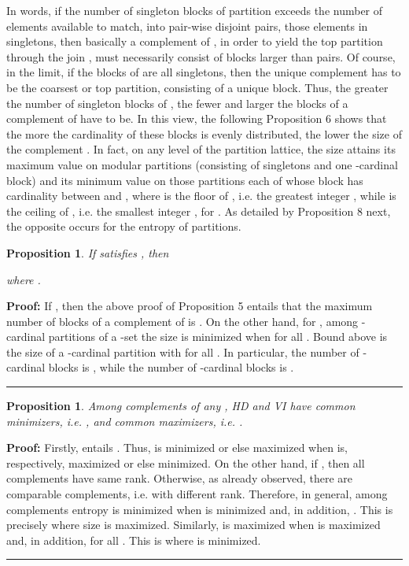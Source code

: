 \documentclass[a4paper,10pt]{article}
\newtheorem{proposition}[theorem]{Proposition}
\newenvironment{proof}[1][Proof]{\noindent\textbf{#1: }}{\ \rule{0.5em}{0.5em}}
\begin{document}
In words, if the number  of singleton blocks of partition  exceeds the number  of elements  available to match, into pair-wise
disjoint pairs, those elements  in singletons, then basically a complement  of , in order to yield the top partition  through the join , must
necessarily consist of blocks larger than pairs. Of course, in the limit, if the blocks of  are all singletons, then the unique complement  has to be the
coarsest or top partition, consisting of a unique block. Thus, the greater the number  of singleton blocks of , the fewer and larger the blocks  of a complement
 of  have to be. In this view, the following Proposition 6 shows that the more the cardinality  of these blocks  is evenly distributed, the lower the size
 of the complement . In fact, on any level  of the partition lattice, the size attains its maximum value on
modular partitions (consisting of  singletons and one -cardinal block) and its minimum value on those partitions each of whose block has cardinality between
 and , where  is the floor of , i.e. the greatest integer , while
 is the ceiling of , i.e. the smallest integer , for . As detailed by Proposition 8 next, the opposite occurs for the
entropy of partitions.

\begin{proposition}
If  satisfies , then

where .
\end{proposition}

\begin{proof}
If , then the above proof of Proposition 5 entails that the maximum number  of blocks of a complement of
 is . On the other hand, for , among -cardinal partitions  of a -set the size is minimized when
 for all . Bound  above is
the size of a -cardinal partition  with  for all
. In particular, the number of -cardinal blocks is
, while the number of -cardinal blocks is
.
\end{proof}
 
\begin{proposition}
Among complements  of any , HD and VI have common minimizers, i.e.
,
and common maximizers, i.e. .
\end{proposition}

\begin{proof}
Firstly,  entails . Thus,  is minimized or else maximized when  is, respectively, maximized or else minimized. On
the other hand, if , then all complements  have same rank. Otherwise, as already observed, there are comparable complements, i.e. with
different rank. Therefore, in general, among complements  entropy  is minimized when  is minimized and, in addition, . This
is precisely where size  is maximized. Similarly,  is maximized when  is maximized and, in addition,
 for all . This is where  is minimized.
\end{proof}
\end{document}
